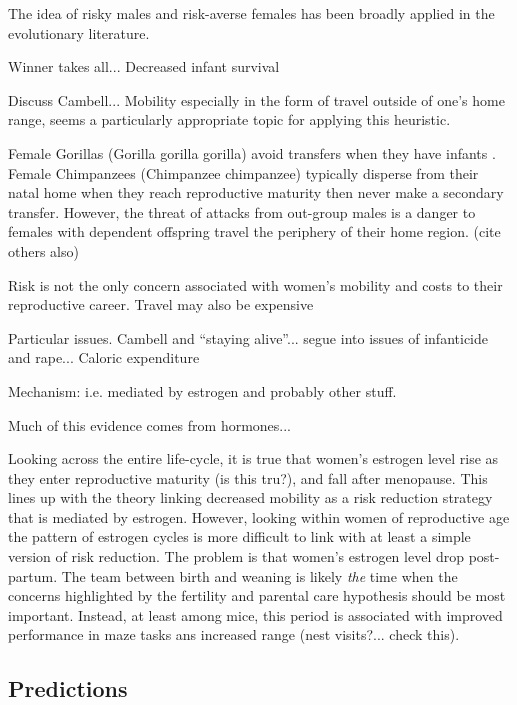 	
	
The idea of risky males and risk-averse females has been broadly applied in the evolutionary literature.

Winner takes all...  Decreased infant survival \cite{hill1996ache, sear2008keeps} 

Discuss Cambell... Mobility especially in the form of travel outside of one's home range, seems a particularly appropriate topic for applying this heuristic.  

Female Gorillas (Gorilla gorilla gorilla) avoid transfers when they have infants \cite{watts1989infanticide, stokes2003female}.  Female Chimpanzees (Chimpanzee chimpanzee) typically disperse from their natal home when they reach reproductive maturity then never make a secondary transfer.  However, the threat of attacks from out-group males is a danger to females with dependent offspring travel the periphery of their home region. \cite{mitani2002recent, watts1989infanticide} (cite others also)


Risk is not the only concern associated with women's mobility and costs to their reproductive career.  Travel may also be expensive 


Particular issues.  Cambell and ``staying alive''... segue into issues of infanticide and rape...  Caloric expenditure

Mechanism: i.e. mediated by estrogen and probably other stuff.

Much of this evidence comes from hormones...

Looking across the entire life-cycle, it is true that women's estrogen level rise as they enter reproductive maturity (is this tru?), and fall after menopause.  This lines up with the theory linking decreased mobility as a risk reduction strategy that is mediated by estrogen.  However, looking within women of reproductive age the pattern of estrogen cycles is more difficult to link with at least a simple version of risk reduction.  The problem is that women's estrogen level drop post-partum.  The team between  birth and weaning is likely \emph{the} time when the concerns highlighted by the fertility and parental care hypothesis should be most important. Instead, at least among mice, this period is associated with improved performance in maze tasks ans increased range (nest visits?... check this). 

	\subsection{Predictions}
	\label{sec:1.2}
	
